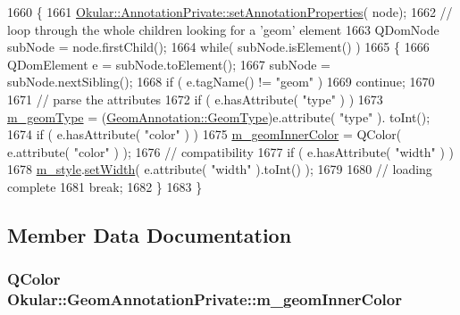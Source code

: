 \begin{DoxyCode}
1660 \{
1661     \hyperlink{classOkular_1_1AnnotationPrivate_a5fc7b450fa8c7e2717372e7394c3aa39}{Okular::AnnotationPrivate::setAnnotationProperties}(
      node);
1662     \textcolor{comment}{// loop through the whole children looking for a 'geom' element}
1663     QDomNode subNode = node.firstChild();
1664     \textcolor{keywordflow}{while}( subNode.isElement() )
1665     \{
1666         QDomElement e = subNode.toElement();
1667         subNode = subNode.nextSibling();
1668         \textcolor{keywordflow}{if} ( e.tagName() != \textcolor{stringliteral}{"geom"} )
1669             \textcolor{keywordflow}{continue};
1670 
1671         \textcolor{comment}{// parse the attributes}
1672         \textcolor{keywordflow}{if} ( e.hasAttribute( \textcolor{stringliteral}{"type"} ) )
1673             \hyperlink{classOkular_1_1GeomAnnotationPrivate_a7a900a31ed0362b56d5e2172df3229dd}{m\_geomType} = (\hyperlink{classOkular_1_1GeomAnnotation_a511623ed10a8d1f18cfd5987fadee682}{GeomAnnotation::GeomType})e.attribute( \textcolor{stringliteral}{"type"} ).
      toInt();
1674         \textcolor{keywordflow}{if} ( e.hasAttribute( \textcolor{stringliteral}{"color"} ) )
1675             \hyperlink{classOkular_1_1GeomAnnotationPrivate_a78118f508054b9edd36744d8a5c18161}{m\_geomInnerColor} = QColor( e.attribute( \textcolor{stringliteral}{"color"} ) );
1676         \textcolor{comment}{// compatibility}
1677         \textcolor{keywordflow}{if} ( e.hasAttribute( \textcolor{stringliteral}{"width"} ) )
1678             \hyperlink{classOkular_1_1AnnotationPrivate_af49e79222d9e16611c0abd90533bc206}{m\_style}.\hyperlink{classOkular_1_1Annotation_1_1Style_af0643b15b59d282c196f0c6114493d9e}{setWidth}( e.attribute( \textcolor{stringliteral}{"width"} ).toInt() );
1679 
1680         \textcolor{comment}{// loading complete}
1681         \textcolor{keywordflow}{break};
1682     \}
1683 \}
\end{DoxyCode}


\subsection{Member Data Documentation}
\hypertarget{classOkular_1_1GeomAnnotationPrivate_a78118f508054b9edd36744d8a5c18161}{
\subsubsection[{m\+\_\+geom\+Inner\+Color}]{\setlength{\rightskip}{0pt plus 5cm}Q\+Color Okular\+::\+Geom\+Annotation\+Private\+::m\+\_\+geom\+Inner\+Color}}\label{classOkular_1_1GeomAnnotationPrivate_a78118f508054b9edd36744d8a5c18161}


